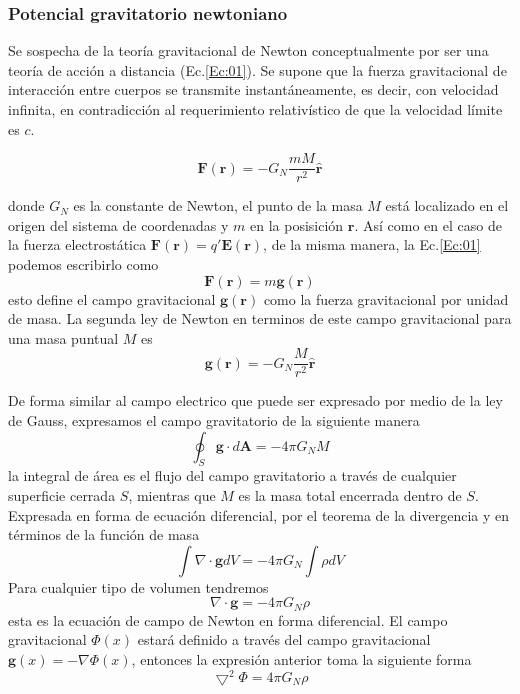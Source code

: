 \documentclass[12pt,twoside]{rif}
\begin{document}
			\subsubsection{Potencial gravitatorio newtoniano}
			Se sospecha de la teoría gravitacional de Newton conceptualmente por ser una teoría de acción a distancia (Ec.\ref*{Ec:01}). Se supone que la fuerza gravitacional de interacción entre cuerpos se transmite instantáneamente, es decir, con velocidad infinita, en contradicción al requerimiento relativístico de que la velocidad límite es $c$. \citep*{resnick1968introduction}
			
			\begin{equation}
				\mathbf{F}(\mathbf{r}) = -G_N \frac{mM}{r^2}\hat{\mathbf{r}}
				\label{Ec:01}
			\end{equation}
			
			donde $G_N$ es la constante de Newton, el punto de la masa $M$ está localizado en el origen del sistema de coordenadas y $m$ en la posisición $\mathbf{r}$. Así como en el caso de la fuerza electrostática $\mathbf{F}(\mathbf{r}) = q' \mathbf{E}(\mathbf{r})$, de la misma manera, la Ec.\ref*{Ec:01} podemos escribirlo como 
			\begin{equation}
				\mathbf{F}(\mathbf{r}) = m \mathbf{g}(\mathbf{r})
				\label{Ec:02}
			\end{equation}
			esto define el campo gravitacional $\mathbf{g}(\mathbf{r})$ como la fuerza gravitacional por unidad de masa. La segunda ley de Newton en terminos de este campo gravitacional para una masa puntual $M$ es 
			\begin{equation}
				\mathbf{g}(\mathbf{r}) 
				=
				-G_{N} \frac{M}{r^2}\hat{\mathbf{r}}
				\label{Ec:03}
			\end{equation}

			De forma similar al campo electrico que puede ser expresado por medio de la ley de Gauss, expresamos el campo gravitatorio de la siguiente manera
			\begin{equation}
				\oint_{S} \mathbf{g} \cdot d\mathbf{A}
				=
				-4\pi G_{N} M
				\label{Ec:04}
			\end{equation}
			la integral de área es el flujo del campo gravitatorio a través de cualquier superficie cerrada $S$, mientras que $M$  es la masa total encerrada dentro de $S$. Expresada en forma de ecuación diferencial,  por el teorema de la divergencia y en términos de la función de masa
			\begin{equation}
				\int \nabla  \cdot \mathbf{g}dV 
				=
				-4 \pi G_N \int \rho dV
				\label{Ec:05}
			\end{equation}
			Para cualquier tipo de volumen tendremos
			\begin{equation}
				\nabla \cdot \mathbf{g}
				=
				-4 \pi G_N  \rho 
				\label{Ec:06}
			\end{equation}
			esta es la ecuación de campo de Newton en forma diferencial. El campo gravitacional $\Phi (x)$ estará definido a través del campo gravitacional $\mathbf{g}(x) = - \nabla \Phi(x)$, entonces la expresión anterior toma la siguiente forma 
			\begin{equation}
				\bigtriangledown^2 \Phi 
				=
				4 \pi G_N \rho
				\label{Ec:07}
			\end{equation}
\end{document}

